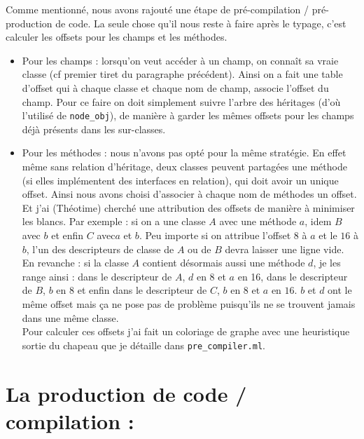 \documentclass[12pt,a4paper]{report}
\begin{document}
\vspace{0.8cm}
\noindent Comme mentionné, nous avons rajouté une étape de pré-compilation / pré-production de code. La seule chose qu'il nous reste à faire après le typage, c'est calculer les offsets pour les champs et les méthodes.
\begin{itemize}
\item Pour les champs : lorsqu'on veut accéder à un champ, on connaît sa vraie classe (cf premier tiret du paragraphe précédent). Ainsi on a fait une table d'offset qui à chaque classe et chaque nom de champ, associe l'offset du champ. Pour ce faire on doit simplement suivre l'arbre des héritages (d'où l'utilisé de \texttt{node\_obj}), de manière à garder les mêmes offsets pour les champs déjà présents dans les sur-classes. 
\item Pour les méthodes : nous n'avons pas opté pour la même stratégie. En effet même sans relation d'héritage, deux classes peuvent partagées une méthode (si elles implémentent des interfaces en relation), qui doit avoir un unique offset. Ainsi nous avons choisi d'associer à chaque nom de méthodes un offset. Et j'ai (Théotime) cherché une attribution des offsets de manière à minimiser les blancs. Par exemple : si on a une classe $A$ avec une méthode $a$, idem $B$ avec $b$ et enfin $C$ avec$a$ et $b$. Peu importe si on attribue l'offset $8$ à $a$ et le $16$ à $b$, l'un des descripteurs de classe de $A$ ou de $B$ devra laisser une ligne vide. En revanche : si la classe $A$ contient désormais aussi une méthode $d$, je les range ainsi : dans le descripteur de $A$, $d$ en $8$ et $a$ en 16, dans le descripteur de $B$, $b$ en $8$ et enfin dans le descripteur de $C$, $b$ en $8$ et $a$ en $16$. $b$ et $d$ ont le même offset mais ça ne pose pas de problème puisqu'ils ne se trouvent jamais dans une même classe. \\
Pour calculer ces offsets j'ai fait un coloriage de graphe avec une heuristique sortie du chapeau que je détaille dans \texttt{pre\_compiler.ml}.
\end{itemize}

\section{La production de code / compilation :}
\end{document}
